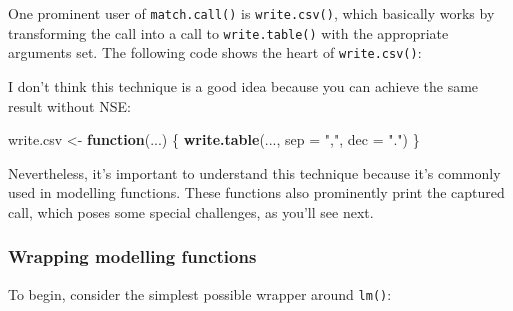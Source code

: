\documentclass[]{book}
\makeatletter
\newenvironment{Shaded}{\begin{snugshade}}{\end{snugshade}}
\newcommand{\ControlFlowTok}[1]{\textcolor[rgb]{0.27,0.27,0.27}{\textbf{#1}}}
\newcommand{\DataTypeTok}[1]{\textcolor[rgb]{0.27,0.27,0.27}{#1}}
\newcommand{\DecValTok}[1]{\textcolor[rgb]{0.06,0.06,0.06}{#1}}
\newcommand{\KeywordTok}[1]{\textcolor[rgb]{0.27,0.27,0.27}{\textbf{#1}}}
\newcommand{\NormalTok}[1]{#1}
\newcommand{\OperatorTok}[1]{\textcolor[rgb]{0.43,0.43,0.43}{\textbf{#1}}}
\newcommand{\OtherTok}[1]{\textcolor[rgb]{0.37,0.37,0.37}{#1}}
\newcommand{\StringTok}[1]{\textcolor[rgb]{0.5,0.5,0.5}{#1}}
\newcommand{\indexc}[1]{\index{#1@\texttt{#1}}}
\makeatother
\begin{document}
One prominent user of \texttt{match.call()} is \texttt{write.csv()}, which basically works by transforming the call into a call to \texttt{write.table()} with the appropriate arguments set. The following code shows the heart of \texttt{write.csv()}:

\begin{Shaded}
\end{Shaded}

I don't think this technique is a good idea because you can achieve the same result without NSE:

\begin{Shaded}
\begin{Highlighting}[]
\NormalTok{write.csv <-}\StringTok{ }\ControlFlowTok{function}\NormalTok{(...) \{}
  \KeywordTok{write.table}\NormalTok{(..., }\DataTypeTok{sep =} \StringTok{","}\NormalTok{, }\DataTypeTok{dec =} \StringTok{"."}\NormalTok{)}
\NormalTok{\}}
\end{Highlighting}
\end{Shaded}

Nevertheless, it's important to understand this technique because it's commonly used in modelling functions. These functions also prominently print the captured call, which poses some special challenges, as you'll see next.

\hypertarget{wrapping-modelling-functions}{%
\subsubsection{Wrapping modelling functions}\label{wrapping-modelling-functions}}

\indexc{lm()}

To begin, consider the simplest possible wrapper around \texttt{lm()}:
\end{document}
